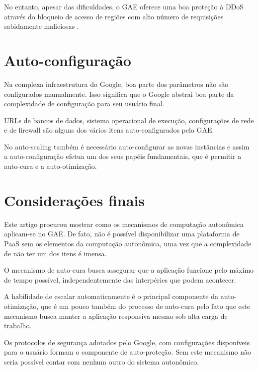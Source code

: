 \documentclass[12pt]{article}
\begin{document}
No entanto, apesar das dificuldades, o GAE oferece uma boa proteção à DDoS
através do bloqueio de acesso de regiões com alto número de requisições
sabidamente maliciosas \cite{dos}.

\section{Auto-configuração}

Na complexa infraestrutura do Google, boa parte dos parâmetros não são
configurados manualmente. Isso significa que o Google abstrai boa parte da
complexidade de configuração para seu usuário final.

URLs de bancos de dados, sistema operacional de execução, configurações de rede
e de firewall são alguns dos vários itens auto-configurados pelo GAE.

No auto-scaling também é necessário auto-configurar as novas instâncias e assim
a auto-configuração efetua um dos seus papéis fundamentais, que é permitir a
auto-cura e a auto-otimização.

\section{Considerações finais}

Este artigo procurou mostrar como os mecanismos de computação autonômica
aplicam-se no GAE. De fato, não é possível disponibilizar uma plataforma de
PaaS sem os elementos da computação autonômica, uma vez que a complexidade de
não ter um dos itens é imensa.

O mecanismo de auto-cura busca assegurar que a aplicação funcione pelo máximo
de tempo possível, independentemente das interpéries que podem acontecer.

A habilidade de escalar automaticamente é o principal componente da
auto-otimização, que é um pouco também do processo de auto-cura pelo fato que
este mecanismo busca manter a aplicação responsiva mesmo sob alta carga de
trabalho.

Os protocolos de segurança adotados pelo Google, com configurações disponíveis
para o usuário formam o componente de auto-proteção. Sem este mecanismo não
seria possível contar com nenhum outro do sistema autonômico.



\end{document}

